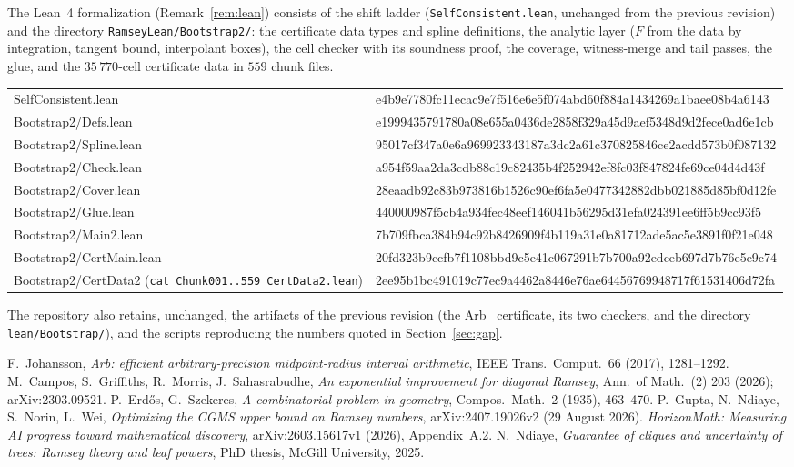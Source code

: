 \documentclass[11pt]{article}
\theoremstyle{definition}
\begin{document}
The Lean~4 formalization (Remark~\ref{rem:lean}) consists of the shift ladder (\texttt{SelfConsistent.lean}, unchanged from the previous revision) and the directory \texttt{RamseyLean/Bootstrap2/}: the certificate data types and spline definitions, the analytic layer ($F$ from the data by integration, tangent bound, interpolant boxes), the cell checker with its soundness proof, the coverage, witness-merge and tail passes, the glue, and the $35\,770$-cell certificate data in $559$ chunk files.
\begin{center}\scriptsize\ttfamily
\begin{tabular}{@{}ll@{}}
SelfConsistent.lean & e4b9e7780fc11ecac9e7f516e6e5f074abd60f884a1434269a1baee08b4a6143\\
Bootstrap2/Defs.lean & e1999435791780a08e655a0436de2858f329a45d9aef5348d9d2fece0ad6e1cb\\
Bootstrap2/Spline.lean & 95017cf347a0e6a969923343187a3dc2a61c370825846ce2acdd573b0f087132\\
Bootstrap2/Check.lean & a954f59aa2da3cdb88c19c82435b4f252942ef8fc03f847824fe69ce04d4d43f\\
Bootstrap2/Cover.lean & 28eaadb92c83b973816b1526c90ef6fa5e0477342882dbb021885d85bf0d12fe\\
Bootstrap2/Glue.lean & 440000987f5cb4a934fec48eef146041b56295d31efa024391ee6ff5b9cc93f5\\
Bootstrap2/Main2.lean & 7b709fbca384b94c92b8426909f4b119a31e0a81712ade5ac5e3891f0f21e048\\
Bootstrap2/CertMain.lean & 20fd323b9ccfb7f1108bbd9c5e41c067291b7b700a92edceb697d7b76e5e9c74\\
Bootstrap2/CertData2 (\texttt{cat Chunk001..559 CertData2.lean}) & 2ee95b1bc491019c77ec9a4462a8446e76ae64456769948717f61531406d72fa\\
\end{tabular}
\end{center}
The repository also retains, unchanged, the artifacts of the previous revision (the Arb~\cite{Arb} certificate, its two checkers, and the directory \texttt{lean/Bootstrap/}), and the scripts reproducing the numbers quoted in Section~\ref{sec:gap}.

\begin{thebibliography}{99}
 F.~Johansson, \emph{Arb: efficient arbitrary-precision midpoint-radius interval arithmetic}, IEEE Trans.\ Comput.\ 66 (2017), 1281--1292.
 M.~Campos, S.~Griffiths, R.~Morris, J.~Sahasrabudhe, \emph{An exponential improvement for diagonal Ramsey}, Ann.\ of Math.\ (2) 203 (2026); arXiv:2303.09521.
 P.~Erd\H{o}s, G.~Szekeres, \emph{A combinatorial problem in geometry}, Compos.\ Math.\ 2 (1935), 463--470.
 P.~Gupta, N.~Ndiaye, S.~Norin, L.~Wei, \emph{Optimizing the CGMS upper bound on Ramsey numbers}, arXiv:2407.19026v2 (29 August 2026).
 \emph{HorizonMath: Measuring AI progress toward mathematical discovery}, arXiv:2603.15617v1 (2026), Appendix~A.2.
 N.~Ndiaye, \emph{Guarantee of cliques and uncertainty of trees: Ramsey theory and leaf powers}, PhD thesis, McGill University, 2025.
\end{thebibliography}
\end{document}
